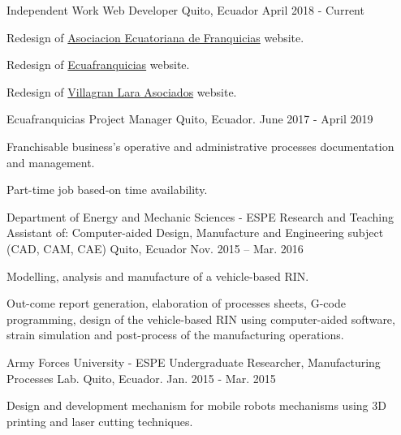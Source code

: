 
\begin{cventries}

  \cventry
    {Independent Work}
    {Web Developer}
    {Quito, Ecuador}
    {April 2018 - Current}
    {
      \begin{cvitems}
        \item {Redesign of \href{https://aefran.org}{Asociacion Ecuatoriana de Franquicias} website.}
        \item {Redesign of \href{http://www.ecuafranquicias.com}{Ecuafranquicias} website.}
        \item {Redesign of \href{http://www.villagranlara.com}{Villagran Lara Asociados} website.}                       
      \end{cvitems} 
    }
    
  \cventry
    {Ecuafranquicias}
    {Project Manager}
    {Quito, Ecuador.}
    {June 2017 - April 2019}
    {
      \begin{cvitems}
        \item {Franchisable business's operative and administrative processes documentation and management.}
        \item {Part-time job based-on time availability.}
      \end{cvitems}
    }

  \cventry
    {Department of Energy and Mechanic Sciences - ESPE}
    {Research and Teaching Assistant of: Computer-aided Design, Manufacture and Engineering subject (CAD, CAM, CAE)	}
    {Quito, Ecuador}
    {Nov. 2015 – Mar. 2016}
    {
      \begin{cvitems}
        \item {Modelling, analysis and manufacture of a vehicle-based RIN. }
        \item {Out-come report generation, elaboration of processes sheets, G-code programming, design of the vehicle-based RIN using computer-aided software, strain simulation and post-process of the manufacturing operations.}
      \end{cvitems}
    }
  
  \cventry
    {Army Forces University - ESPE}
    {Undergraduate Researcher, Manufacturing Processes Lab.}
    {Quito, Ecuador.}
    {Jan. 2015 - Mar. 2015}
    {
      \begin{cvitems}
        \item {Design and development mechanism for mobile robots mechanisms using 3D printing and laser cutting techniques.}
      \end{cvitems}
    }
        
\end{cventries}
